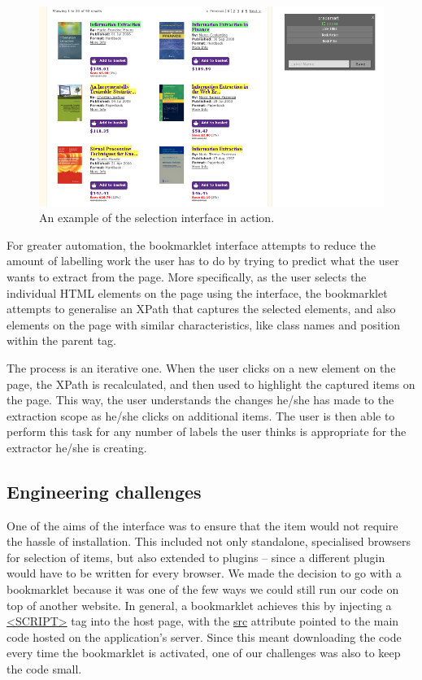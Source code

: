 \begin{figure}[htbp]
\centering
\includegraphics[scale=0.43]{selection_example.png} 
\caption{An example of the selection interface in action.}
\label{fig:selection_example}
\end{figure}


For greater automation, the bookmarklet interface attempts to reduce the amount of labelling
work the user has to do by trying to predict what the user wants to extract from the page.
More specifically, as the user selects the individual HTML elements on the page using the interface,
the bookmarklet attempts to generalise an XPath that captures the selected elements,
and also elements on the page with similar characteristics, like class names and position
within the parent tag.


The process is an iterative one. When the user clicks on a new element on the page,
the XPath is recalculated, and then used to highlight the captured items on the page.
This way, the user understands the changes he/she has made to the extraction scope as he/she
clicks on additional items. The user is then able to perform this task for any number of labels
the user thinks is appropriate for the extractor he/she is creating.

\subsection{Engineering challenges}

One of the aims of the interface was to ensure that the item would not require the hassle of
installation. This included not only standalone, specialised browsers for selection of items,
but also extended to plugins -- since a different plugin would have to be written for every
browser. We made the decision to go with a bookmarklet because it was one of the few ways
we could still run our code on top of another website. In general, a bookmarklet achieves
this by injecting a \url{<SCRIPT>} tag into the host page, with the \url{src} attribute pointed
to the main code hosted on the application's server. Since this meant downloading the code
every time the bookmarklet is activated, one of our challenges was also to keep the code small.

